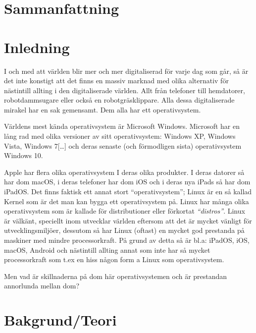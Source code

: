 \documentclass[12pt, a4paper]{report}
\begin{document}
\section{Sammanfattning}\label{sum}




\vspace{1cm}

    
\section{Inledning}
 
 
   I och med att världen blir mer och mer digitaliserad för varje dag som går, så är det inte konstigt att det finns en massiv marknad med olika alternativ för nästintill allting i den digitaliserade världen. Allt från telefoner till hemdatorer, robotdammsugare eller också en robotgräsklippare. Alla dessa digitaliserade mirakel har en sak gemensamt. Dem alla har ett operativsystem.
 
   Världens mest kända operativsystem\cite{winstat} är Microsoft Windows. Microsoft har en lång rad med olika versioner av sitt operativsystem\cite{windows}: Windows XP, Windows Vista, Windows 7[\dots] och deras senaste (och förmodligen sista) operativsystem Windows 10.
    
   Apple har flera olika operativsystem I deras olika produkter. I deras datorer så har dom macOS, i deras telefoner har dom iOS och i deras nya iPads så har dom iPadOS.\cite{appleOS}
    Det finns faktisk ett annat stort ``operativsystem''; Linux är en så kallad Kernel \cite{redhat} som är det man kan bygga ett operativsystem på. Linux har många olika operativsystem som är kallade för distributioner eller förkortat \textit{``distros''}. Linux är välkänt, speciellt inom utvecklar världen eftersom att det är mycket vänligt för utvecklingsmiljöer, dessutom så har Linux (oftast) en mycket god prestanda på maskiner med mindre processorkraft\cite{whatislinux}. På grund av detta så är bl.a: iPadOS, iOS, macOS, Android och nästintill allting annat som inte har så mycket processorkraft som t.ex en hiss någon form a Linux som operativsystem.

    Men vad är skillnaderna på dom här operativsystemen och är prestandan annorlunda mellan dom?
    
\section{Bakgrund/Teori}
\end{document}
